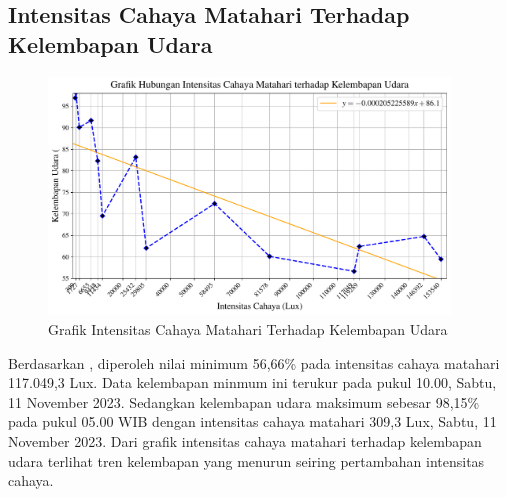 \subsection{Intensitas Cahaya Matahari Terhadap Kelembapan Udara}
\begin{figure}[H]
    \includegraphics[width=0.95\textwidth]{dataset/grafik intensitas vs kelembapan.pdf}
    \caption{Grafik Intensitas Cahaya Matahari Terhadap Kelembapan Udara}
\end{figure}
Berdasarkan , diperoleh nilai minimum 56,66\% pada intensitas cahaya matahari 117.049,3 Lux. Data kelembapan minmum ini terukur pada pukul 10.00, Sabtu, 11 November 2023. Sedangkan kelembapan udara maksimum sebesar 98,15\% pada pukul 05.00 WIB dengan intensitas cahaya matahari 309,3 Lux, Sabtu, 11 November 2023. Dari grafik intensitas cahaya matahari terhadap kelembapan udara terlihat tren kelembapan yang menurun seiring pertambahan intensitas cahaya.

